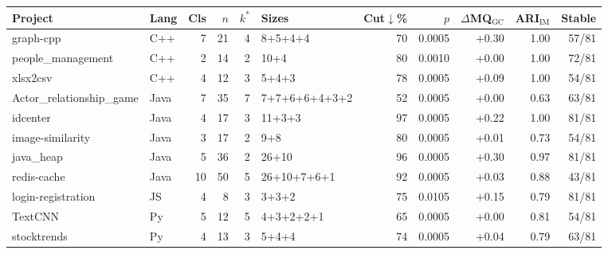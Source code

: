 \begin{tabular}{@{}llrrrlrrrrr@{}}
\toprule
Project & Lang & Cls & $n$ & $k^\ast$ & Sizes & Cut$\downarrow$\% & $p$ & $\Delta$MQ$_{\text{GC}}$ & ARI$_{\text{IM}}$ & Stable \\
\midrule
graph-cpp & C++ & 7 & 21 & 4 & 8+5+4+4 & 70 & 0.0005 & +0.30 & 1.00 & 57/81 \\
people\_management & C++ & 2 & 14 & 2 & 10+4 & 80 & 0.0010 & +0.00 & 1.00 & 72/81 \\
xlsx2csv & C++ & 4 & 12 & 3 & 5+4+3 & 78 & 0.0005 & +0.09 & 1.00 & 54/81 \\
Actor\_relationship\_game & Java & 7 & 35 & 7 & 7+7+6+6+4+3+2 & 52 & 0.0005 & +0.00 & 0.63 & 63/81 \\
idcenter & Java & 4 & 17 & 3 & 11+3+3 & 97 & 0.0005 & +0.22 & 1.00 & 81/81 \\
image-similarity & Java & 3 & 17 & 2 & 9+8 & 80 & 0.0005 & +0.01 & 0.73 & 54/81 \\
java\_heap & Java & 5 & 36 & 2 & 26+10 & 96 & 0.0005 & +0.30 & 0.97 & 81/81 \\
redis-cache & Java & 10 & 50 & 5 & 26+10+7+6+1 & 92 & 0.0005 & +0.03 & 0.88 & 43/81 \\
login-registration & JS & 4 & 8 & 3 & 3+3+2 & 75 & 0.0105 & +0.15 & 0.79 & 81/81 \\
TextCNN & Py & 5 & 12 & 5 & 4+3+2+2+1 & 65 & 0.0005 & +0.00 & 0.81 & 54/81 \\
stocktrends & Py & 4 & 13 & 3 & 5+4+4 & 74 & 0.0005 & +0.04 & 0.79 & 63/81 \\
\bottomrule
\end{tabular}
